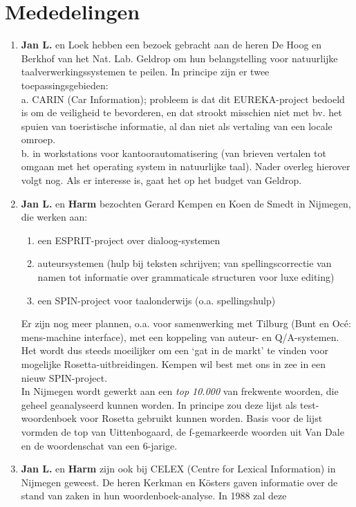 \section{Mededelingen}
\begin{enumerate}
  \item {\bf Jan L.} en Loek hebben een bezoek gebracht aan de heren De Hoog en 
Berkhof van het Nat. Lab. Geldrop om hun belangstelling voor natuurlijke 
taal\-ver\-werkingssystemen te peilen. In principe zijn er twee 
toepassingsgebieden:
\\
a. CARIN (Car Information); probleem is dat dit EUREKA-project bedoeld is om de 
veiligheid te bevorderen, en dat strookt misschien niet met bv. het spuien van 
toeristische informatie, al dan niet als vertaling van een locale omroep.\\
b. in workstations voor kantoorautomatisering (van brieven vertalen tot omgaan 
met het operating system in natuurlijke taal). Nader overleg hierover volgt 
nog. Als er interesse is, gaat het op het budget van Geldrop.
  \item {\bf Jan L.} en {\bf Harm} bezochten Gerard Kempen en Koen de Smedt 
in Nijmegen, die werken aan:
\begin{enumerate}
  \item een ESPRIT-project over dialoog-systemen
  \item auteursystemen (hulp bij teksten schrijven; van spellingscorrectie van 
namen tot informatie over grammaticale structuren voor luxe editing)
  \item een SPIN-project voor taalonderwijs (o.a. spellingshulp)
\end{enumerate}
Er zijn nog meer plannen, o.a. voor samenwerking met Tilburg (Bunt en Oc\'{e}:
mens-machine interface), met een koppeling van auteur- en Q/A-systemen. Het 
wordt dus steeds moeilijker om een `gat in de markt' te vinden voor mogelijke 
Rosetta-uitbreidingen. Kempen wil best met ons in zee in een nieuw 
SPIN-project.\\
In Nijmegen wordt gewerkt aan een {\em top 10.000} van frekwente woorden, die 
geheel geanalyseerd kunnen worden. In principe zou deze lijst als 
test-woorden\-boek voor Rosetta gebruikt kunnen worden. Basis voor de lijst 
vormden de top van Uittenbogaard, de f-gemarkeerde woorden uit Van Dale en de 
woordenschat van een 6-jarige.
  \item {\bf Jan L.} en {\bf Harm} zijn ook bij CELEX (Centre for Lexical 
Information) in Nijmegen geweest. De heren Kerkman en K\"{o}sters gaven 
informatie over de stand van zaken in hun woordenboek-analyse. In 1988 zal deze 

\end{enumerate}
